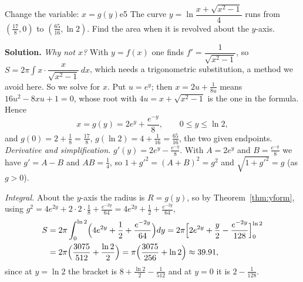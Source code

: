 \documentclass[11pt]{article}
\begin{document}
\begin{exmp}{Change the variable: $x=g(y)$}{e5}
The curve $y=\ln\dfrac{x+\sqrt{x^2-1}}4$ runs from $(\frac{17}8,0)$ to $(\frac{65}{16},\ln2)$. Find the area when it is revolved about the $y$-axis.

\textbf{Solution.} \emph{Why not $x$?} With $y=f(x)$ one finds $f'=\dfrac1{\sqrt{x^2-1}}$, so $S=2\pi\int x\cdot\dfrac x{\sqrt{x^2-1}}\,dx$, which needs a trigonometric substitution, a method we avoid here. So we solve for $x$. Put $u=e^y$; then $x=2u+\frac1{8u}$ means $16u^2-8xu+1=0$, whose root with $4u=x+\sqrt{x^2-1}$ is the one in the formula. Hence
\[
x=g(y)=2e^y+\frac{e^{-y}}8,\qquad 0\le y\le\ln2 ,
\]
and $g(0)=2+\frac18=\frac{17}8$, $g(\ln2)=4+\frac1{16}=\frac{65}{16}$, the two given endpoints.
\emph{Derivative and simplification.} $g'(y)=2e^y-\frac{e^{-y}}8$. With $A=2e^y$ and $B=\frac{e^{-y}}8$ we have $g'=A-B$ and $AB=\frac14$, so $1+g'^2=(A+B)^2=g^2$ and $\sqrt{1+g'^2}=g$ (as $g>0$).

\emph{Integral.} About the $y$-axis the radius is $R=g(y)$, so by Theorem~\ref{thm:yform}, using $g^2=4e^{2y}+2\cdot2\cdot\frac18+\frac{e^{-2y}}{64}=4e^{2y}+\frac12+\frac{e^{-2y}}{64}$,
\[
\begin{aligned}
S&=2\pi\int_0^{\ln2}\Bigl(4e^{2y}+\frac12+\frac{e^{-2y}}{64}\Bigr)dy=2\pi\Bigl[2e^{2y}+\frac y2-\frac{e^{-2y}}{128}\Bigr]_0^{\ln2}\\
&=2\pi\Bigl(\frac{3075}{512}+\frac{\ln2}2\Bigr)=\pi\Bigl(\frac{3075}{256}+\ln2\Bigr)\approx39.91 ,
\end{aligned}
\]
since at $y=\ln2$ the bracket is $8+\frac{\ln2}2-\frac1{512}$ and at $y=0$ it is $2-\frac1{128}$.


\end{exmp}
\end{document}
